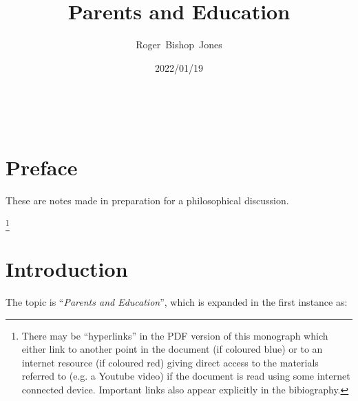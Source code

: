 \documentclass[10pt,titlepage]{article}
\title{\LARGE\bf Parents and Education}
\author{Roger~Bishop~Jones}
\date{\small 2022/01/19}
\newcommand{\ignore}[1]{}
\begin{document}
                               
\begin{titlepage}
\maketitle





\end{titlepage}

\ \

\ignore{
\begin{centering}
{}
\end{centering}
}%

\setcounter{tocdepth}{2}
{\parskip-0pt\tableofcontents}


\pagebreak

\section*{Preface}

These are notes made in preparation for a philosophical discussion.




\footnote{There may be ``hyperlinks'' in the PDF version of this monograph which either link to another point in the document  (if coloured blue) or to an internet resource  (if coloured red) giving direct access to the materials referred to (e.g. a Youtube video) if the document is read using some internet connected device.
Important links also appear explicitly in the bibiography.}

\section{Introduction}

The topic is ``\emph{Parents and Education}'', which is expanded in the first instance as:
\end{document}

